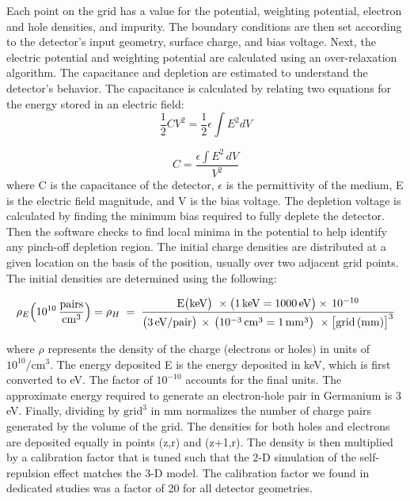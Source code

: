 Each point on the grid has a value for the potential, weighting potential, electron and hole densities, and impurity. The boundary conditions are then set according to the detector's input geometry, surface charge, and bias voltage. Next, the electric potential and weighting potential are calculated using an over-relaxation algorithm. The capacitance and depletion are estimated to understand the detector's behavior. The capacitance is calculated by relating two equations for the energy stored in an electric field:
\begin{equation}
    \frac{1}{2} C V^2 = \frac{1}{2} \epsilon \int E^2 dV
\end{equation}

\begin{equation}
    C = \frac{\epsilon \int E^2 \, dV}{V^2}
\end{equation}
where C is the capacitance of the detector, $\epsilon$ is the permittivity of the medium, E is the electric field magnitude, and V is the bias voltage. The depletion voltage is calculated by finding the minimum bias required to fully deplete the detector. Then the software checks to find local minima in the potential to help identify any pinch-off depletion region. The initial charge densities are distributed at a given location on the basis of the position, usually over two adjacent grid points. The initial densities are determined using the following:

\begin{equation}
\rho_E \Bigl(10^{10} \,\frac{\mathrm{pairs}}{\mathrm{cm^3}}\Bigr) = \rho_H  \;=\;
\frac{ \mathrm{E}\bigl(\mathrm{keV}\bigr)\ \times \bigl(1\,\mathrm{keV} = 1000\,\mathrm{eV}\bigr) \times\,10^{-10} }{\bigl(3\,\mathrm{eV/pair}\bigr)\,\times\, \bigl(10^{-3}\,\mathrm{cm}^{3} = 1\,\mathrm{mm}^3\bigr)\ \times \bigl[\text{grid}\,(\mathrm{mm})\bigr]^3 }
\label{eq:density_with_units}
\end{equation}

where $\rho$ represents the density of the charge (electrons or holes) in units of $10^{10}/\text{cm}^3$. The energy deposited E is the energy deposited in keV, which is first converted to eV. The factor of $10^{-10}$ accounts for the final units. The approximate energy required to generate an electron-hole pair in Germanium is $3$ eV. Finally, dividing by $\text{grid}^3$ in mm normalizes the number of charge pairs generated by the volume of the grid. The densities for both holes and electrons are deposited equally in points (z,r) and (z+1,r). The density is then multiplied by a calibration factor that is tuned such that the $2$-D simulation of the self-repulsion effect matches the $3$-D model. The calibration factor we found in dedicated studies was a factor of 20 for all detector geometries.

